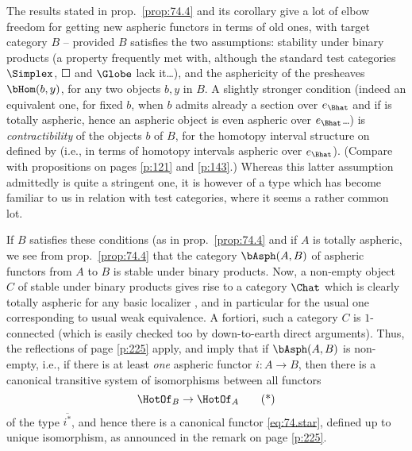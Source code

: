\begin{remarks}
  The results stated in prop.\ \ref{prop:74.4} and its corollary give
  a lot of elbow freedom for getting new aspheric functors in terms of
  old ones, with target category $B$ -- provided $B$ satisfies the two
  assumptions: stability under binary products (a property frequently
  met with, although the standard test categories $\Simplex$,
  $\Square$ and $\Globe$ lack it\ldots), and the asphericity of the
  presheaves $\bHom(b,y)$, for any two objects $b,y$ in $B$. A
  slightly stronger condition (indeed an equivalent one, for fixed
  $b$, when $b$ admits already a section over $e_\Bhat$ and if \Bhat{}
  is totally aspheric, hence an aspheric object is even aspheric over
  $e_\Bhat$\ldots) is \emph{contractibility} of the objects $b$ of
  $B$, for the homotopy interval structure on \Bhat{} defined by
  \scrWB{} (i.e., in terms of homotopy intervals aspheric over
  $e_\Bhat$). (Compare with propositions on pages
  \ref{p:121} and \ref{p:143}.) Whereas this latter assumption
  admittedly is quite a stringent one, it is however of a type which
  has become familiar to us in relation with test categories, where it
  seems a rather common lot.

  If $B$ satisfies these conditions (as in prop.\ \ref{prop:74.4} and
  if $A$ is totally aspheric, we see from prop.\ \ref{prop:74.4} that
  the category $\bAsph(A,B)$ of aspheric functors from $A$ to $B$ is
  stable under binary products. Now, a non-empty object $C$ of \Cat{}
  stable under binary products gives rise to a category $\Chat$
  which is clearly totally aspheric for any basic localizer \scrW, and
  in particular for the usual one \scrWz{} corresponding to usual
  weak equivalence. A fortiori, such a category $C$ is $1$-connected
  (which is easily checked too by down-to-earth direct
  arguments). Thus, the reflections of page \ref{p:225} apply, and
  imply that if $\bAsph(A,B)$ is non-empty, i.e., if there is at least
  \emph{one} aspheric functor $i:A\to B$, then there is a canonical
  transitive system of isomorphisms between all functors
  \begin{equation}
    \label{eq:74.star}
    \HotOf_B \to \HotOf_A\tag{*}
  \end{equation}
  of the type $\overline{i^*}$, and hence there is a canonical functor
  \eqref{eq:74.star}, defined up to unique isomorphism, as announced
  in the remark on page \ref{p:225}.
\end{remarks}

